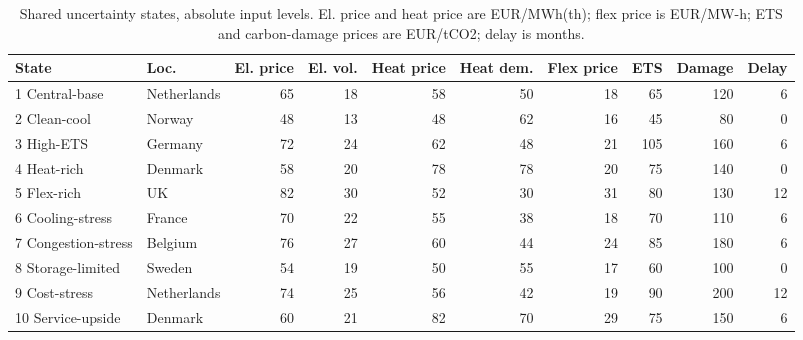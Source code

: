 \documentclass[preprint,12pt]{elsarticle}
\begin{document}
\begin{table}[tbp]
\centering
\tiny
\setlength{\tabcolsep}{1.5pt}
\caption{Shared uncertainty states, absolute input levels. El. price and heat price are EUR/MWh(th); flex price is EUR/MW-h; ETS and carbon-damage prices are EUR/tCO2; delay is months.}
\label{tab:uncertainty-state-levels}
\begin{tabular}{l l r r r r r r r r}
\toprule
State & Loc. & El. price & El. vol. & Heat price & Heat dem. & Flex price & ETS & Damage & Delay \\
\midrule
1 Central-base & Netherlands & 65 & 18 & 58 & 50 & 18 & 65 & 120 & 6 \\
2 Clean-cool & Norway & 48 & 13 & 48 & 62 & 16 & 45 & 80 & 0 \\
3 High-ETS & Germany & 72 & 24 & 62 & 48 & 21 & 105 & 160 & 6 \\
4 Heat-rich & Denmark & 58 & 20 & 78 & 78 & 20 & 75 & 140 & 0 \\
5 Flex-rich & UK & 82 & 30 & 52 & 30 & 31 & 80 & 130 & 12 \\
6 Cooling-stress & France & 70 & 22 & 55 & 38 & 18 & 70 & 110 & 6 \\
7 Congestion-stress & Belgium & 76 & 27 & 60 & 44 & 24 & 85 & 180 & 6 \\
8 Storage-limited & Sweden & 54 & 19 & 50 & 55 & 17 & 60 & 100 & 0 \\
9 Cost-stress & Netherlands & 74 & 25 & 56 & 42 & 19 & 90 & 200 & 12 \\
10 Service-upside & Denmark & 60 & 21 & 82 & 70 & 29 & 75 & 150 & 6 \\
\bottomrule
\end{tabular}
\end{table}
\end{document}
